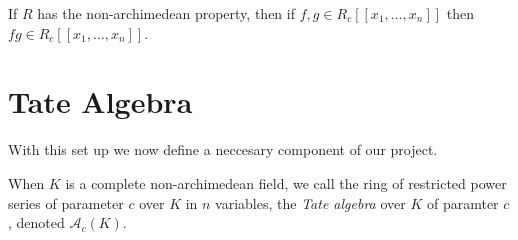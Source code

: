 \begin{lemma}
  \label{mul}
  \leanok
  If $R$ has the non-archimedean property, then if $f,g \in R_c [ \! [ x_1, \dots, x_n ] \! ]$ then
  $fg \in R_c [ \! [ x_1, \dots, x_n ] \! ]$.
\end{lemma}

\section{Tate Algebra}

With this set up we now define a neccesary component of our project.

\begin{definition}
  When $K$ is a complete non-archimedean field, we call the ring of restricted power series of
  parameter $c$ over $K$ in $n$ variables, the \emph{Tate algebra} over $K$ of paramter $c$, denoted
  $\mathcal{A}_c(K).$
\end{definition}
